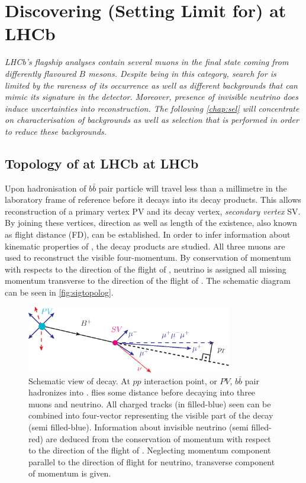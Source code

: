 \chapter{Discovering (Setting Limit for) \Bmumumu at LHCb}
\label{chap:sel}

\textit{LHCb's flagship analyses contain several muons in the final state coming from differently flavoured $B$ mesons. Despite being in this category, search for \Bmumumu is limited by the rareness of its occurrence as well as different backgrounds that can mimic its signature in the detector. Moreover, presence of invisible neutrino does induce uncertainties into reconstruction. The following \autoref{chap:sel} will concentrate on characterisation of backgrounds as well as selection that is performed in order to reduce these backgrounds.}


\section{Topology of at LHCb \Bmumumu at LHCb }

Upon hadronisation of $b\bar{b}$ pair \Bpm particle will travel less than a millimetre in the laboratory frame of reference before it decays into its decay products. This allows reconstruction of a primary vertex \gls{PV} and its decay vertex, \textit{secondary vertex} \gls{SV}. By joining these vertices, direction as well as length of the \Bpm existence, also known as flight distance (\gls{FD}), can be established. In order to infer information about kinematic properties of \Bpm, the decay products are studied. All three muons are used to reconstruct the visible four-momentum. By conservation of momentum with respects to the direction of the flight of \Bpm, neutrino is assigned all missing momentum transverse to the direction of the flight of \Bpm. The schematic diagram can be seen in \autoref{fig:sigtopolog}.

\begin{figure}[!h]
	\centering
	\includegraphics[width = 0.8\textwidth]{figs/sel/DecReco_fin.eps}
	\caption{Schematic view of \Bmumumu decay. At $pp$ interaction point, or $PV$, $b\bar{b}$ pair hadronizes into \Bpm. \Bpm flies some distance before decaying into three muons and neutrino. All charged tracks (in filled-blue) seen can be combined into four-vector representing the visible part of the decay (semi filled-blue). Information about invisible neutrino (semi filled-red) are deduced from the conservation of momentum with respect to the direction of the flight of \Bpm. Neglecting momentum component parallel to the direction of flight for neutrino, transverse component of momentum is given.}
	\label{fig:sigtopolog}
\end{figure}

